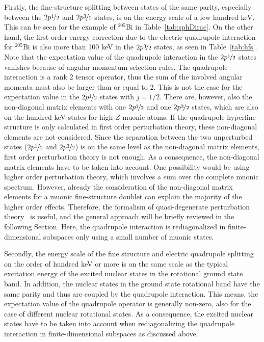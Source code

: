 Firstly, the fine-structure splitting between states of the same parity, especially between the $2p\nicefrac{1}{2}$ and $2p\nicefrac{3}{2}$ states, is on the energy scale of a few hundred keV. This can be seen for the example of $^{205}$Bi in Table~\ref{tab:sphDirac}. On the other hand, the first order energy correction due to the electric quadrupole interaction for $^{205}$Bi is also more than 100 keV in the $2p\nicefrac{3}{2}$ states, as seen in Table~\ref{tab:hfs}. Note that the expectation value of the quadrupole interaction in the $2p\nicefrac{1}{2}$ states vanishes because of angular momentum selection rules. The quadrupole interaction is a rank 2 tensor operator, thus the sum of the involved angular momenta must also be larger than or equal to 2. This is not the case for the expectation value in the $2p\nicefrac{1}{2}$ states with $j=1/2$. There are, however, also the non-diagonal matrix elements with one $2p\nicefrac{1}{2}$ and one $2p\nicefrac{3}{2}$ states, which are also on the hundred keV states for high $Z$ muonic atoms. If the quadrupole hyperfine structure is only calculated in first order perturbation theory, these non-diagonal elements are not considered. Since the separation between the two unperturbed states ($2p\nicefrac{1}{2}$ and $2p\nicefrac{3}{2}$) is on the same level as the non-diagonal matrix elements, first order perturbation theory is not enough. As a consequence, the non-diagonal matrix elements have to be taken into account. One possibility would be using higher order perturbation theory, which involves a sum over the complete muonic spectrum. However, already the consideration of the non-diagonal matrix elements for a muonic fine-structure doublet can explain the majority of the higher order effects. Therefore, the formalism of quasi-degenerate perturbation theory~\cite{sakurai1994} is useful, and the general approach will be briefly reviewed in the following Section. Here, the quadrupole interaction is rediagonalized in finite-dimensional subspaces only using a small number of muonic states.

Secondly, the energy scale of the fine structure and electric quadrupole splitting on the order of hundred keV or more is on the same scale as the typical excitation energy of the excited nuclear states in the rotational ground state band. In addition, the nuclear states in the ground state rotational band have the same parity and thus are coupled by the quadrupole interaction. This means, the expectation value of the quadrupole operator is generally non-zero, also for the case of different nuclear rotational states. As a consequence, the excited nuclear states have to be taken into account when rediagonalizing the quadrupole interaction in finite-dimensional subspaces as discussed above.

